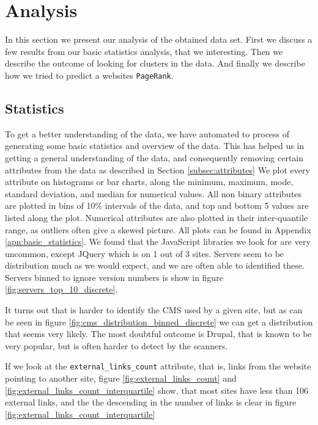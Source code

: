 \section{Analysis}
\label{sec:analysis}

In this section we present our analysis of the obtained data set. First we discuss a few results from our basic statistics analysis, that we interesting. Then we describe the outcome of looking for clusters in the data. And finally we describe how we tried to predict a websites \texttt{PageRank}.

\subsection{Statistics}
\label{subsec:statistics}
To get a better understanding of the data, we have automated to process of generating some basic statistics and overview of the data. This has helped us in getting a general understanding of the data, and consequently removing certain attributes from the data as described in Section \ref{subsec:attributes} We plot every attribute on histograms or bar charts, along the minimum, maximum, mode, standard deviation, and median for numerical values. All non binary attributes are plotted in bins of 10\% intervals of the data, and top and bottom 5 values are listed along the plot. Numerical attributes are also plotted in their inter-quantile range, as outliers often give a skewed picture. All plots can be found in Appendix \ref{apn:basic_statistics}. We found that the JavaScript libraries we look for are very uncommon, except JQuery which is on 1 out of 3 sites. Servers seem to be distribution much as we would expect, and we are often able to identified these. Servers binned to ignore version numbers is show in figure \ref{fig:servers_top_10_discrete}.


It turns out that is harder to identify the CMS used by a given site, but as can be seen in figure \ref{fig:cms_distribution_binned_discrete} we can get a distribution that seems very likely. The most doubtful outcome is Drupal, that is known to be very popular, but is often harder to detect by the scanners.


If we look at the \texttt{external\_links\_count} attribute, that is, links from the website pointing to another site, figure \ref{fig:external_links_count} and \ref{fig:external_links_count_interquartile} show, that most sites have less than 106 external links, and the the descending in the number of links is clear in figure \ref{fig:external_links_count_interquartile}

